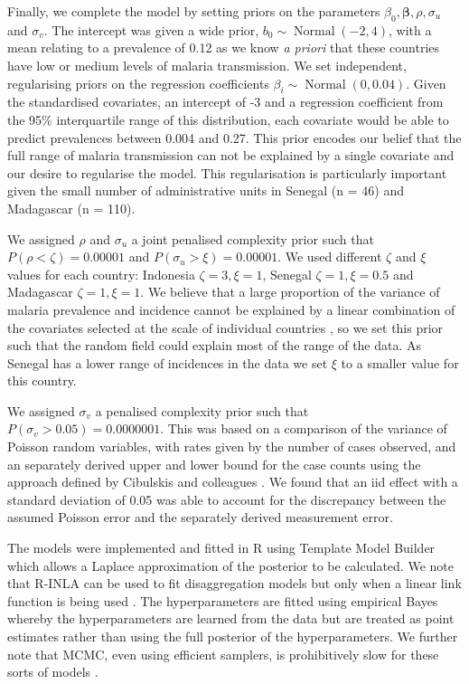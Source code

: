 \documentclass{statsoc}
\begin{document}
Finally, we complete the model by setting priors on the parameters $\beta_0, \boldsymbol\beta, \rho, \sigma_u$ and $\sigma_v$.
The intercept was given a wide prior, $b_0 \sim \operatorname{Normal}(-2, 4)$, with a mean relating to a prevalence of 0.12 as we know \emph{a priori} that these countries have low or medium levels of malaria transmission.
We set independent, regularising priors on the regression coefficients $\beta_i \sim \operatorname{Normal}(0, 0.04)$. 
Given the standardised covariates, an intercept of -3 and a regression coefficient from the 95\% interquartile range of this distribution, each covariate would be able to predict prevalences between 0.004 and 0.27. 
This prior encodes our belief that the full range of malaria transmission can not be explained by a single covariate and our desire to regularise the model.
This regularisation is particularly important given the small number of administrative units in Senegal (n = 46) and Madagascar (n = 110).

We assigned $\rho$ and $\sigma_u$ a joint penalised complexity prior \citep{fuglstad2018constructing} such that $P(\rho < \zeta) = 0.00001$ and $P(\sigma_u > \xi) = 0.00001$.
We used different $\zeta$  and $\xi$ values for each country: Indonesia $\zeta = 3, \xi = 1$, Senegal $\zeta = 1, \xi = 0.5$ and Madagascar $\zeta = 1, \xi = 1$.
We believe that a large proportion of the variance of malaria prevalence and incidence cannot be explained by a linear combination of the covariates selected at the scale of individual countries \citep{bhatt2017improved}, so we set this prior such that the random field could explain most of the range of the data.
As Senegal has a lower range of incidences in the data we set $\xi$ to a smaller value for this country.

We assigned $\sigma_v$ a penalised complexity prior \citep{simpson2017penalising} such that $P(\sigma_v > 0.05) = 0.0000001$.
This was based on a comparison of the variance of Poisson random variables, with rates given by the number of cases observed, and an separately derived upper and lower bound for the case counts using the approach defined by Cibulskis and colleagues \citep{cibulskis2011worldwide}.
We found that an iid effect with a standard deviation of 0.05 was able to account for the discrepancy between the assumed Poisson error and the separately derived measurement error.

The models were implemented and fitted in R \citep{R} using Template Model Builder \citep{TMB} which allows a Laplace approximation of the posterior to be calculated.
We note that R-INLA \citep{INLA} can be used to fit disaggregation models but only when a linear link function is being used \citep{wilson2017pointless}.
The hyperparameters are fitted using empirical Bayes whereby the hyperparameters are learned from the data but are treated as point estimates rather than using the full posterior of the hyperparameters.
We further note that MCMC, even using efficient samplers, is prohibitively slow for these sorts of models \citep{nandi2020disaggregation}. 
\end{document}
